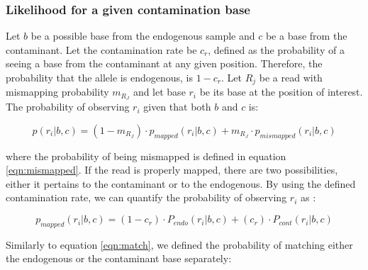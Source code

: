 \documentclass[a4paper,12pt]{article}
\begin{document}
{%

\subsubsection{Likelihood for a given contamination base}

Let $b$ be a possible base from the endogenous sample and $c$ be a base from the contaminant. Let the contamination rate be $c_r$, defined as the probability of a seeing a base from the contaminant at any given position. Therefore, the probability that the allele is endogenous, is $1-c_r$. Let $R_j$ be a read with mismapping probability $m_{R_J}$ and let base $r_i$ be its base at the position of interest. The probability of observing $r_i$ given that both $b$ and $c$ is:

\begin{equation}
p(r_i|b,c)  = (1-m_{R_J}) \cdot p_{mapped}(r_i|b,c) + m_{R_J} \cdot p_{mismapped}(r_i|b,c)  
\label{eqn:singlereadcont}
\end{equation}

\noindent where the probability of being mismapped is defined in equation \ref{eqn:mismapped}. If the read is properly mapped, there are two possibilities, either it pertains to the contaminant or to the endogenous. By using the defined contamination rate, we can quantify the probability of observing $r_i$ as :

\begin{equation}
p_{mapped}(r_i|b,c) = (1-c_r) \cdot P_{endo} (r_i|b,c)   + (c_r) \cdot P_{cont} (r_i|b,c)
\end{equation}

\noindent Similarly to equation \ref{eqn:match}, we defined the probability of matching either the endogenous or the contaminant base separately:


}
\end{document}
